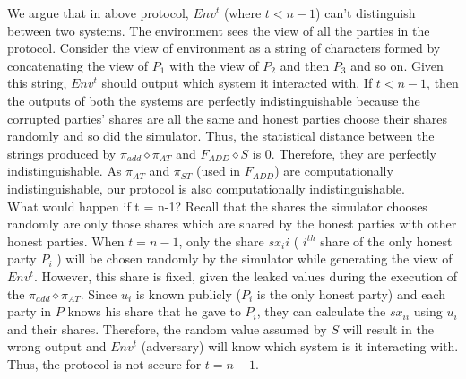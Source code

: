 \documentclass{llncs}
\begin{document}
We argue that in above protocol, $Env^t$ (where $t<n-1$) can’t distinguish between two systems. The environment sees the view of all the parties in the protocol. Consider the view of environment as a string of characters formed by concatenating the view of $P_1$ with the view of $P_2$ and then $P_3$ and so on. Given this string, $Env^t$ should output which system it interacted with. If $t < n-1$, then the outputs of both the systems are perfectly indistinguishable because the corrupted parties' shares are all the same and honest parties choose their shares randomly and so did the simulator. Thus, the statistical distance between the strings produced by $\pi_{add} \diamond \pi_{AT}$ and $F_{ADD} \diamond S$ is 0. Therefore, they are perfectly indistinguishable. As $\pi_{AT}$ and $\pi_{ST}$ (used in $F_{ADD}$) are computationally indistinguishable, our protocol is also computationally indistinguishable. \\
What would happen if t = n-1?
Recall that the shares the simulator chooses randomly are only those shares  which are shared by the honest parties with other honest parties. When $t = n-1$, only the share $sx_ii$ ( $i^{th}$ share of the only honest party $P_i$ ) will be chosen randomly by the simulator while generating the view of $Env^t$. However, this share is fixed, given the leaked values during the execution of the $\pi_{add} \diamond \pi_{AT}$. Since $u_i$ is known publicly ($P_i$ is the only honest party) and each party in $P$ knows his share that he gave to $P_i$, they can calculate the $sx_{ii}$ using $u_i$ and their shares. Therefore, the random value assumed by $S$ will result in the wrong output and $Env^t$ (adversary) will know which system is it interacting with. Thus, the protocol is not secure for $t = n-1$.
\end{document}
